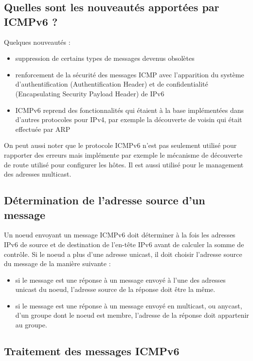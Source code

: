 \subsection{Quelles sont les nouveautés apportées par ICMPv6 ?}

Quelques nouveautés :
	\begin{itemize}
    	\item suppression de certains types de messages devenus obsolètes
        \item renforcement de la sécurité des messages ICMP avec l'apparition du système d'authentification (Authentification Header) et de confidentialité (Encapsulating Security Payload Header) de IPv6
        \item ICMPv6 reprend des fonctionnalités qui étaient à la base implémentées dans d'autres protocoles pour IPv4, par exemple la découverte de voisin qui était effectuée par ARP
    \end{itemize}
\medskip

On peut aussi noter que le protocole ICMPv6 n'est pas seulement utilisé pour rapporter des erreurs mais implémente par exemple le mécanisme de découverte de route utilisé pour configurer les hôtes. Il est aussi utilisé pour le management des adresses multicast.
    
\medskip

\subsection{Détermination de l'adresse source d'un message}

Un noeud envoyant un message ICMPv6 doit déterminer à la fois les adresses IPv6 de source et de destination de l'en-tête IPv6 avant de calculer la somme de contrôle. Si le noeud a plus d'une adresse unicast, il doit choisir l'adresse source du message de la manière suivante :
    \begin{itemize}
		\item{si le message est une réponse à un message envoyé à l'une des adresses unicast du noeud, l'adresse source de la réponse doit être la même.}
		\item{si le message est une réponse à un message envoyé en multicast, ou anycast, d'un groupe dont le noeud est membre, l'adresse de la réponse doit appartenir au groupe.}
	\end{itemize}
    
\subsection{Traitement des messages ICMPv6}

